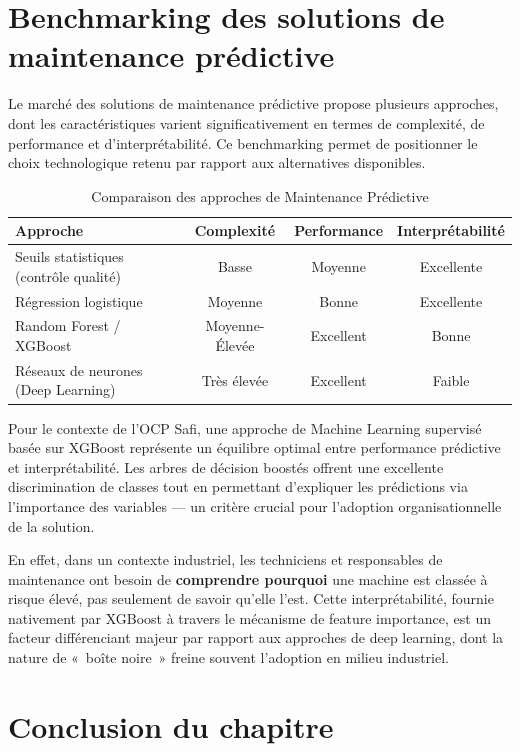 \documentclass[a4paper,12pt]{report}
\begin{document}
\section{Benchmarking des solutions de maintenance prédictive}

Le marché des solutions de maintenance prédictive propose plusieurs approches, dont les caractéristiques varient significativement en termes de complexité, de performance et d'interprétabilité. Ce benchmarking permet de positionner le choix technologique retenu par rapport aux alternatives disponibles.

\begin{table}[H]
\centering
\small
\caption{Comparaison des approches de Maintenance Prédictive}
\begin{tabular}{|l|c|c|c|}
\hline
\textbf{Approche} & \textbf{Complexité} & \textbf{Performance} & \textbf{Interprétabilité} \\
\hline\hline
Seuils statistiques (contrôle qualité) & Basse & Moyenne & Excellente \\
\hline
Régression logistique & Moyenne & Bonne & Excellente \\
\hline
Random Forest / XGBoost & Moyenne-Élevée & Excellent & Bonne \\
\hline
Réseaux de neurones (Deep Learning) & Très élevée & Excellent & Faible \\
\hline
\end{tabular}
\end{table}

Pour le contexte de l'OCP Safi, une approche de Machine Learning supervisé basée sur XGBoost représente un équilibre optimal entre performance prédictive et interprétabilité. Les arbres de décision boostés offrent une excellente discrimination de classes tout en permettant d'expliquer les prédictions via l'importance des variables — un critère crucial pour l'adoption organisationnelle de la solution.

En effet, dans un contexte industriel, les techniciens et responsables de maintenance ont besoin de \textbf{comprendre pourquoi} une machine est classée à risque élevé, pas seulement de savoir qu'elle l'est. Cette interprétabilité, fournie nativement par XGBoost à travers le mécanisme de feature importance, est un facteur différenciant majeur par rapport aux approches de deep learning, dont la nature de «~boîte noire~» freine souvent l'adoption en milieu industriel.

\section*{Conclusion du chapitre}
\end{document}
